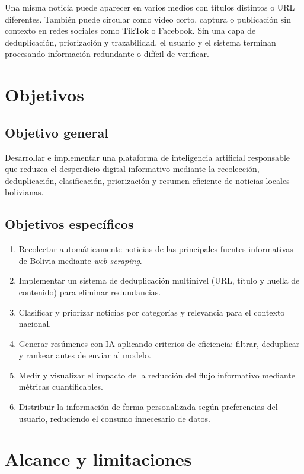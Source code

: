 Una misma noticia puede aparecer en varios medios con t\'itulos distintos o URL diferentes. Tambi\'en puede circular como video corto, captura o publicaci\'on sin contexto en redes sociales como TikTok o Facebook. Sin una capa de deduplicaci\'on, priorizaci\'on y trazabilidad, el usuario y el sistema terminan procesando informaci\'on redundante o dif\'icil de verificar.

\section{Objetivos}

\subsection{Objetivo general}

Desarrollar e implementar una plataforma de inteligencia artificial responsable que reduzca el desperdicio digital informativo mediante la recolecci\'on, deduplicaci\'on, clasificaci\'on, priorizaci\'on y resumen eficiente de noticias locales bolivianas.

\subsection{Objetivos espec\'ificos}

\begin{enumerate}[nosep]
    \item Recolectar autom\'aticamente noticias de las principales fuentes informativas de Bolivia mediante \textit{web scraping}.
    \item Implementar un sistema de deduplicaci\'on multinivel (URL, t\'itulo y huella de contenido) para eliminar redundancias.
    \item Clasificar y priorizar noticias por categor\'ias y relevancia para el contexto nacional.
    \item Generar res\'umenes con IA aplicando criterios de eficiencia: filtrar, deduplicar y rankear antes de enviar al modelo.
    \item Medir y visualizar el impacto de la reducci\'on del flujo informativo mediante m\'etricas cuantificables.
    \item Distribuir la informaci\'on de forma personalizada seg\'un preferencias del usuario, reduciendo el consumo innecesario de datos.
\end{enumerate}

\section{Alcance y limitaciones}


